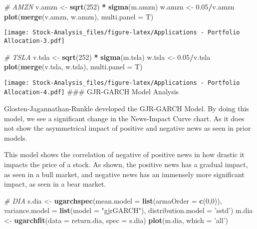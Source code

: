 \documentclass[
]{article}
\newenvironment{Shaded}{\begin{snugshade}}{\end{snugshade}}
\newcommand{\CommentTok}[1]{\textcolor[rgb]{0.56,0.35,0.01}{\textit{#1}}}
\newcommand{\DataTypeTok}[1]{\textcolor[rgb]{0.13,0.29,0.53}{#1}}
\newcommand{\DecValTok}[1]{\textcolor[rgb]{0.00,0.00,0.81}{#1}}
\newcommand{\FloatTok}[1]{\textcolor[rgb]{0.00,0.00,0.81}{#1}}
\newcommand{\KeywordTok}[1]{\textcolor[rgb]{0.13,0.29,0.53}{\textbf{#1}}}
\newcommand{\NormalTok}[1]{#1}
\newcommand{\OperatorTok}[1]{\textcolor[rgb]{0.81,0.36,0.00}{\textbf{#1}}}
\newcommand{\StringTok}[1]{\textcolor[rgb]{0.31,0.60,0.02}{#1}}
\begin{document}
\begin{Shaded}
\begin{Highlighting}[]
\CommentTok{# AMZN}
\NormalTok{v.amzn <-}\StringTok{ }\KeywordTok{sqrt}\NormalTok{(}\DecValTok{252}\NormalTok{) }\OperatorTok{*}\StringTok{ }\KeywordTok{sigma}\NormalTok{(m.amzn)}
\NormalTok{w.amzn <-}\StringTok{ }\FloatTok{0.05}\OperatorTok{/}\NormalTok{v.amzn}
\KeywordTok{plot}\NormalTok{(}\KeywordTok{merge}\NormalTok{(v.amzn, w.amzn),}
     \DataTypeTok{multi.panel =}\NormalTok{ T)}
\end{Highlighting}
\end{Shaded}

\texttt{[image: Stock-Analysis\_files/figure-latex/Applications - Portfolio Allocation-3.pdf]}

\begin{Shaded}
\begin{Highlighting}[]
\CommentTok{# TSLA}
\NormalTok{v.tsla <-}\StringTok{ }\KeywordTok{sqrt}\NormalTok{(}\DecValTok{252}\NormalTok{) }\OperatorTok{*}\StringTok{ }\KeywordTok{sigma}\NormalTok{(m.tsla)}
\NormalTok{w.tsla <-}\StringTok{ }\FloatTok{0.05}\OperatorTok{/}\NormalTok{v.tsla}
\KeywordTok{plot}\NormalTok{(}\KeywordTok{merge}\NormalTok{(v.tsla, w.tsla),}
     \DataTypeTok{multi.panel =}\NormalTok{ T)}
\end{Highlighting}
\end{Shaded}

\texttt{[image: Stock-Analysis\_files/figure-latex/Applications - Portfolio Allocation-4.pdf]}
\#\#\# GJR-GARCH Model Analysis

Glosten-Jagannathan-Runkle developed the GJR-GARCH Model. By doing this
model, we see a significant change in the News-Impact Curve chart. As it
does not show the asymmetrical impact of positive and negative news as
seen in prior models.

This model shows the correlation of negative of positive news in how
drastic it impacts the price of a stock. As shown, the positive news has
a gradual impact, as seen in a bull market, and negative news has an
immensely more significant impact, as seen in a bear market.

\begin{Shaded}
\begin{Highlighting}[]
\CommentTok{# DIA}
\NormalTok{s.dia <-}\StringTok{ }\KeywordTok{ugarchspec}\NormalTok{(}\DataTypeTok{mean.model =} \KeywordTok{list}\NormalTok{(}\DataTypeTok{armaOrder =} \KeywordTok{c}\NormalTok{(}\DecValTok{0}\NormalTok{,}\DecValTok{0}\NormalTok{)),}
                \DataTypeTok{variance.model =} \KeywordTok{list}\NormalTok{(}\DataTypeTok{model =} \StringTok{"gjrGARCH"}\NormalTok{),}
                \DataTypeTok{distribution.model =} \StringTok{'sstd'}\NormalTok{)}
\NormalTok{m.dia <-}\StringTok{ }\KeywordTok{ugarchfit}\NormalTok{(}\DataTypeTok{data =}\NormalTok{ return.dia, }\DataTypeTok{spec =}\NormalTok{ s.dia)}
\KeywordTok{plot}\NormalTok{(m.dia, }\DataTypeTok{which =} \StringTok{'all'}\NormalTok{)}
\end{Highlighting}
\end{Shaded}
\end{document}
